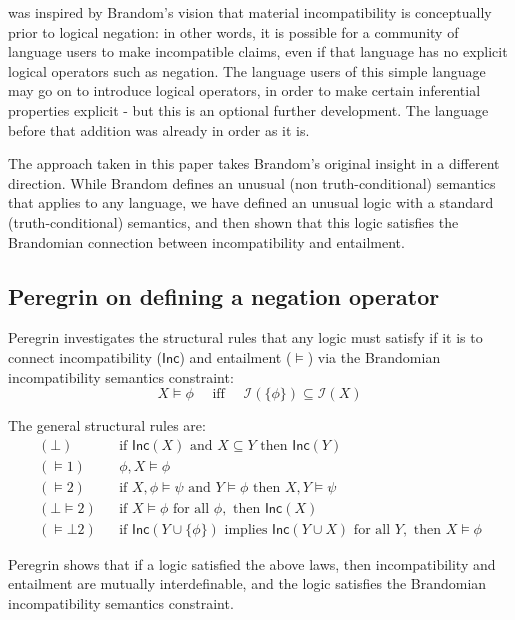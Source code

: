 \Cathoristic{} was inspired by Brandom's vision that material
incompatibility is conceptually prior to logical negation: in other
words, it is possible for a community of language users to make incompatible claims, even if that
language has no explicit logical operators such as negation.  The
language users of this simple language may go on to introduce logical
operators, in order to make certain inferential properties explicit -
but this is an optional further development.  The language before that
addition was already in order as it is.

The approach taken in this paper takes Brandom's original insight in a
different direction.  While Brandom defines an unusual (non
truth-conditional) semantics that applies to any language, we have
defined an unusual logic with a standard (truth-conditional) semantics, and then shown that this logic satisfies the Brandomian connection between incompatibility and entailment.

\subsection{Peregrin on defining a negation operator}\label{peregrin}

Peregrin \cite{PeregrinJ:logbasoi} investigates the  structural
rules that any logic must satisfy if it is to connect incompatibility
($\mathsf{Inc}$) and entailment ($\models$) via the Brandomian
incompatibility semantics constraint:
\[
X \models \phi \quad\text{ iff }\quad \mathcal{I}(\{\phi\}) \subseteq \mathcal{I}(X)
\]

\NI The general structural rules are:
\begin{eqnarray*}
  (\bot) & & \text{if } \mathsf{Inc}(X) \text{ and } X \subseteq Y \text{ then } \mathsf{Inc}(Y) \\
  (\models 1) & & \phi, X \models \phi \\
  (\models 2) & & \text{if }X, \phi \models \psi \text{ and } Y \models \phi \text{ then } X, Y \models \psi \\
  (\bot \models 2) & & \text{if } X \models \phi \text{ for all } \phi, \text{ then } \mathsf{Inc}(X) \\
  (\models \bot 2) & & \text{if } \mathsf{Inc}(Y \cup \{\phi\}) \text{ implies } \mathsf{Inc}(Y \cup X) \text{ for all } Y, \text{ then } X \models \phi
\end{eqnarray*}

\NI Peregrin shows that if a logic satisfied the above laws, then
incompatibility and entailment are mutually interdefinable, and the
logic satisfies the Brandomian incompatibility semantics constraint.

